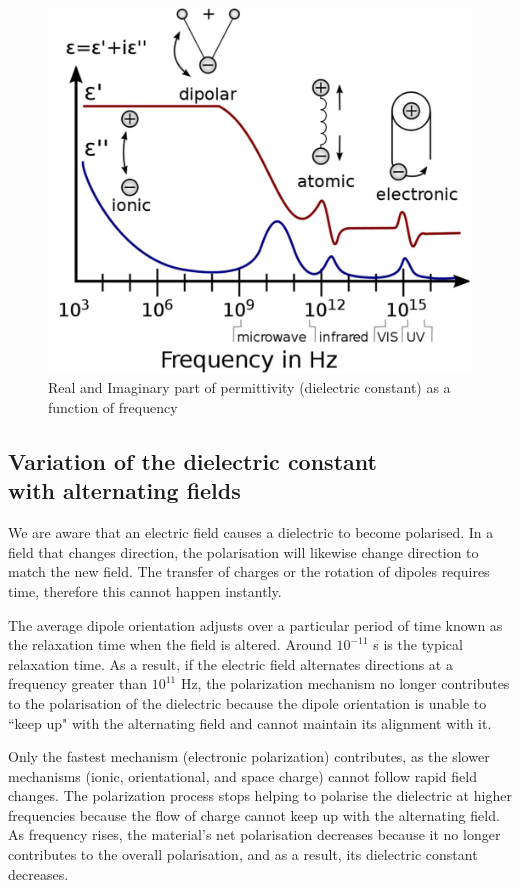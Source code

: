 	\begin{figure}[H]
		\centering
		\label{fig:1}
		\includegraphics[width=0.8\columnwidth]{images/t1.png}
		\caption{Real and Imaginary part of permittivity (dielectric constant) as a function of frequency}
	\end{figure}
	
	\subsection*{Variation of the dielectric constant\\
	with alternating fields}
		We are aware that an electric field causes a dielectric to become polarised. In a field that changes direction, the polarisation will likewise change direction to match the new field. The transfer of charges or the rotation of dipoles requires time, therefore this cannot happen instantly.

		The average dipole orientation adjusts over a particular period of time known as the relaxation time when the field is altered. Around $10^{-11}$ s is the typical relaxation time. As a result, if the electric field alternates directions at a frequency greater than $10^{11}$ Hz, the polarization mechanism no longer contributes to the polarisation of the dielectric because the dipole orientation is unable to ``keep up" with the alternating field and cannot maintain its alignment with it.
		
		Only the fastest mechanism (electronic polarization) contributes, as the slower mechanisms (ionic,
		orientational, and space charge) cannot follow rapid field changes. The polarization process stops helping to polarise the dielectric at higher frequencies because the flow of charge cannot keep up with the alternating field. As frequency rises, the material's net polarisation decreases because it no longer contributes to the overall polarisation, and as a result, its dielectric constant decreases.

